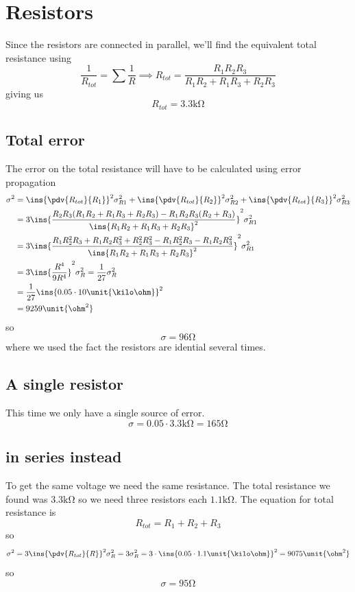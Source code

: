 \clearpage
\section{Resistors}
Since the resistors are connected in parallel, we'll find the equivalent total resistance using 
\begin{equation}
    \frac{1}{R_{tot}}=\sum\frac{1}{R} \implies R_{tot}=\frac{R_1R_2R_3}{R_1R_2+R_1R_3+R_2R_3}
\end{equation}
giving us 
\begin{equation}
    R_{tot}=3.3\unit{\kilo\ohm}
\end{equation}
\subsection{Total error}
The error on the total resistance will have to be calculated using error propagation
\begin{align}
    \sigma^2&=\ins{\pdv{R_{tot}}{R_1}}^2\sigma_{R1}^2+\ins{\pdv{R_{tot}}{R_2}}^2\sigma_{R2}^2+\ins{\pdv{R_{tot}}{R_3}}^2\sigma_{R3}^2\\
    &= 3\ins{\frac{R_2R_3(R_1R_2+R_1R_3+R_2R_3) - R_1R_2R_3(R_2+R_3)}{\ins{R_1R_2+R_1R_3+R_2R_3}^2}}^2\sigma_{R1}^2\\
    &= 3\ins{\frac{R_1R_2^2R_3+R_1R_2R_3^2+R_2^2R_3^2-R_1R_2^2R_3-R_1R_2R_3^2}{\ins{R_1R_2+R_1R_3+R_2R_3}^2}}^2\sigma_{R1}^2\\
    &= 3\ins{\frac{R^4}{9R^4}}^2\sigma_{R}^2=\frac{1}{27}\sigma_{R}^2\\
    &= \frac{1}{27}\ins{0.05\cdot10\unit{\kilo\ohm}}^2\\
    &= 9259\unit{\ohm^2}
\end{align}
so 
\begin{equation}
    \sigma=96\unit{\ohm}
\end{equation}
where we used the fact the resistors are idential several times.
\subsection{A single resistor}
This time we only have a single source of error.
\begin{equation}
    \sigma=0.05\cdot3.3\unit{\kilo\ohm}=165\unit{\ohm}
\end{equation}
\subsection{in series instead}
To get the same voltage we need the same resistance. The total resistance we found was \(3.3\unit{\kilo\ohm}\) so we need three resistors each \(1.1\unit{\kilo\ohm}\). The equation for total resistance is 
\begin{equation}
    R_{tot}=R_1+R_2+R_3
\end{equation}
so 
\begin{equation}
    \sigma^2=3\ins{\pdv{R_{tot}}{R}}^2\sigma_R^2=3\sigma_R^2=3\cdot\ins{0.05\cdot1.1\unit{\kilo\ohm}}^2=9075\unit{\ohm^2}
\end{equation}
so
\begin{equation}
    \sigma=95\unit{\ohm}
\end{equation}
